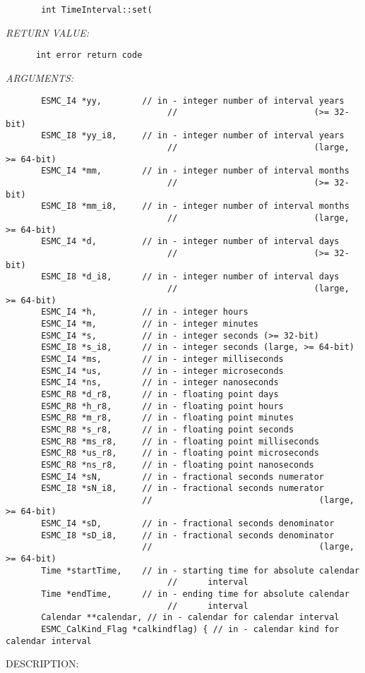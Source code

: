   
\begin{verbatim}       int TimeInterval::set(\end{verbatim}{\em RETURN VALUE:}
\begin{verbatim}      int error return code\end{verbatim}{\em ARGUMENTS:}
\begin{verbatim}       ESMC_I4 *yy,        // in - integer number of interval years
                                //                           (>= 32-bit)
       ESMC_I8 *yy_i8,     // in - integer number of interval years
                                //                           (large, >= 64-bit)
       ESMC_I4 *mm,        // in - integer number of interval months
                                //                           (>= 32-bit)
       ESMC_I8 *mm_i8,     // in - integer number of interval months
                                //                           (large, >= 64-bit)
       ESMC_I4 *d,         // in - integer number of interval days
                                //                           (>= 32-bit)
       ESMC_I8 *d_i8,      // in - integer number of interval days
                                //                           (large, >= 64-bit)
       ESMC_I4 *h,         // in - integer hours
       ESMC_I4 *m,         // in - integer minutes
       ESMC_I4 *s,         // in - integer seconds (>= 32-bit)
       ESMC_I8 *s_i8,      // in - integer seconds (large, >= 64-bit)
       ESMC_I4 *ms,        // in - integer milliseconds
       ESMC_I4 *us,        // in - integer microseconds
       ESMC_I4 *ns,        // in - integer nanoseconds
       ESMC_R8 *d_r8,      // in - floating point days
       ESMC_R8 *h_r8,      // in - floating point hours
       ESMC_R8 *m_r8,      // in - floating point minutes
       ESMC_R8 *s_r8,      // in - floating point seconds
       ESMC_R8 *ms_r8,     // in - floating point milliseconds
       ESMC_R8 *us_r8,     // in - floating point microseconds
       ESMC_R8 *ns_r8,     // in - floating point nanoseconds
       ESMC_I4 *sN,        // in - fractional seconds numerator
       ESMC_I8 *sN_i8,     // in - fractional seconds numerator
                           //                                 (large, >= 64-bit)
       ESMC_I4 *sD,        // in - fractional seconds denominator
       ESMC_I8 *sD_i8,     // in - fractional seconds denominator
                           //                                 (large, >= 64-bit)
       Time *startTime,    // in - starting time for absolute calendar
                                //      interval
       Time *endTime,      // in - ending time for absolute calendar
                                //      interval
       Calendar **calendar, // in - calendar for calendar interval
       ESMC_CalKind_Flag *calkindflag) { // in - calendar kind for calendar interval\end{verbatim}
{\sf DESCRIPTION:\\ }


